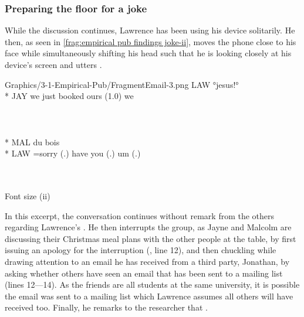 \subsubsection{Preparing the floor for a joke}\label{sec:empirical pub findings joke floorprep}
\begin{revisedsubmission}
While the discussion continues, Lawrence has been using his device solitarily.
He then, as seen in \autoref{frag:empirical pub findings joke-ii}, moves the phone close to his face while simultaneously shifting his head such that he is looking closely at his device's screen and utters .

\begin{inlinefrag*}
    {
    \begin{transcript*}[6]
           {Graphics/3-1-Empirical-Pub/FragmentEmail-3.png}
        \by LAW {°jesus!°} \\*
        \by JAY {we just booked ours (1.0) we} \\
         \\
         \\
         \\*
        \by MAL {du bois\intUp} \\*
        \by LAW {=sorry (.) have you (.) um (.)} \\
         \\
         \\
    \end{transcript*}
    \caption{Font size (ii)}\label{frag:empirical pub findings joke-ii}
    }
\end{inlinefrag*}

In this excerpt, the conversation continues without remark from the others regarding Lawrence's .
He then interrupts the group, as Jayne and Malcolm are discussing their Christmas meal plans with the other people at the table, by first issuing an apology for the interruption (, line 12), and then chuckling while drawing attention to an email he has received from a third party, Jonathan, by asking whether others have seen an email that has been sent to a mailing list (lines 12---14).
As the friends are all students at the same university, it is possible the email was sent to a mailing list which Lawrence assumes all others will have received too.
Finally, he remarks to the researcher that .


\end{revisedsubmission}
